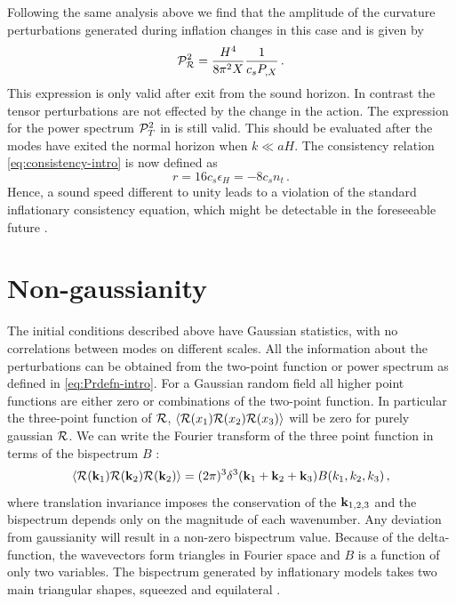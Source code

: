 Following the same analysis above we find that the amplitude of the curvature 
perturbations 
generated during inflation changes in this case and is given by \cite{gm}
% 
\begin{equation} 
\label{eq:Ps-dbiintro}
 \mathcal{P}_{\mathcal{R}}^2  = \frac{H^4}{8\pi^2 X}\frac{1}{c_s P_{,X}} \,.
\end{equation}
% 
This expression is only valid after exit from the sound horizon. In contrast
the tensor perturbations are not effected by the change in the action. The
expression for the power spectrum $\mathcal{P}_T^2$ in  is still valid.
This should be evaluated after the modes have exited the normal horizon
when $k\ll aH$. 
The consistency relation \eqref{eq:consistency-intro} is now defined as
\cite{gm} 
% 
\begin{equation}
\label{eq:rdefn-dbiintro}
  r = 16c_s \epsilon_H = -8c_s n_t \,.
\end{equation}
% 
Hence, a sound speed different to unity leads to a violation of the 
standard inflationary consistency equation, which might be 
detectable in the foreseeable future \cite{lidser1,lidser2}. 




\section{Non-gaussianity}
\label{sec:fnl-intro}
The initial conditions described above have Gaussian statistics, with no correlations between modes
on different scales. All the information about the perturbations can be obtained from the
two-point function or power spectrum as defined in \eqref{eq:Prdefn-intro}. For a Gaussian random 
field all higher point functions are either zero or combinations of the two-point function. In
particular the three-point function of $\mathcal{R}$, $\langle
\mathcal{R}(x_1)\mathcal{R}(x_2)\mathcal{R}(x_3)\rangle$ will be zero for purely gaussian $\mathcal{R}$. We can write the Fourier
transform of the three point function in terms of the bispectrum $B$
\cite{Bartolo:2004if}:
% 
\begin{equation}
 \langle \mathcal{R}(\textbf{k}_1)\mathcal{R}(\textbf{k}_2)\mathcal{R}(\textbf{k}_2)\rangle = (2\pi)^3 \delta^3(\textbf{k}_1 + \textbf{k}_2 + \textbf{k}_3) B(k_1, k_2,
k_3)\,,
\end{equation}
% 
where translation invariance imposes the conservation of the $\textbf{k}_{1,2,3}$ and
the bispectrum
depends only on the magnitude of each wavenumber. Any deviation from gaussianity will result in a
non-zero bispectrum value. 
Because of the delta-function, the wavevectors form triangles in Fourier
space and $B$ is a function of only two variables. The bispectrum generated by
inflationary models
takes two main triangular shapes, squeezed and equilateral \cite{Babich:2004gb}.
 
